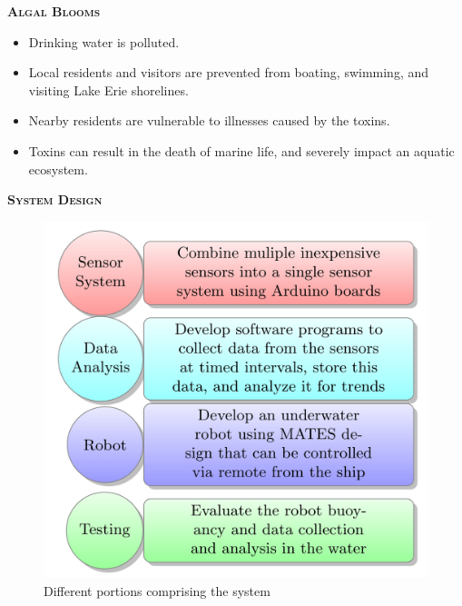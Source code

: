 \documentclass[final,t]{beamer}
\begin{document}
\begin{frame}{}
\begin{columns}
\begin{column}{.5\linewidth}
\begin{block}{\textsc{\textbf{Algal Blooms}}}
                \begin{itemize}
               		\item Drinking water is polluted.
					\item Local residents and visitors are prevented from boating, swimming,
          and visiting Lake Erie shorelines.
					\item Nearby residents are vulnerable to illnesses caused by the toxins.
					\item Toxins can result in the death of marine life, and severely impact
          an aquatic ecosystem.
				\end{itemize}
                    \vspace*{3mm}
                \end{block}
                \begin{alertblock}{\textsc{\textbf{System Design}}}
					   \begin{figure}
                    		\includegraphics[scale = 4]{assets/diagram.jpg}
                    	\caption{Different portions comprising the system}
                    	\end{figure}
                \end{alertblock}


\end{column}
\end{columns}
\end{frame}
\end{document}
